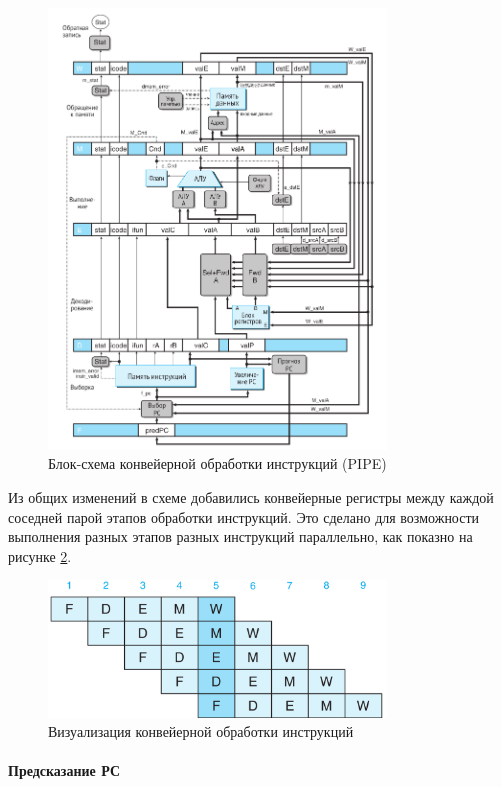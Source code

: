 \documentclass[12pt,a4paper]{article}
\begin{document}
\begin{figure}[ht!]
\centering
\includegraphics[width=0.8\textwidth]{pipe.png}
\caption{Блок-схема конвейерной обработки инструкций (PIPE)}
\label{fig:pipe}
\end{figure}

Из общих изменений в схеме добавились конвейерные регистры между каждой соседней парой этапов обработки инструкций. Это сделано для возможности выполнения разных этапов разных инструкций параллельно, как показно на рисунке \ref{fig:pipeline}.

\begin{figure}[ht!]
    \centering
    \includegraphics[width=0.8\textwidth]{pipeline.png}
    \caption{Визуализация конвейерной обработки инструкций}
    \label{fig:pipeline}
\end{figure}

\paragraph{Предсказание РС}
\indent
\end{document}

